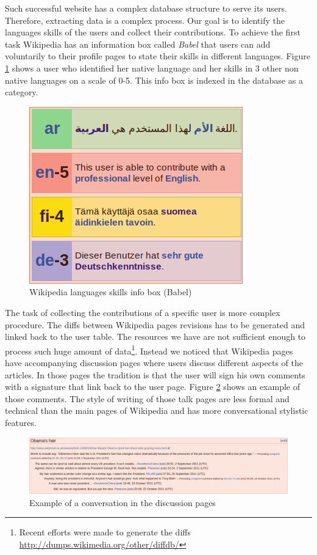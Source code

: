 \documentclass[10pt,a5paper,twoside]{article}
\begin{document}
Such successful website has a complex database structure to serve its users.
Therefore, extracting data is a complex process. Our goal is to identify the
languages skills of the users and collect their contributions. To achieve the
first task Wikipedia has an information box called \emph{Babel} that users can
add voluntarily to their profile pages to state their skills in different
languages. Figure \ref{babel} shows a user who identified her native language
and her skills in 3 other non native languages on a scale of 0-5. This info box
is indexed in the database as a category.

\begin{figure}
\centering
\includegraphics[scale=0.40]{babel} 
\caption{Wikipedia languages skills info box (Babel)}
\label{babel}
\end{figure}

The task of collecting the contributions of a specific user is more complex
procedure. The diffs between Wikipedia pages revisions has to be generated and
linked back to the user table. The resources we have are not sufficient enough to process such
huge amount of data\footnote{Recent efforts were
made to generate the diffs \url{http://dumps.wikimedia.org/other/diffdb/}}.
Instead we noticed that Wikipedia pages have accompanying discussion pages where
users discuss different aspects of the articles. In those pages the tradition is
that the user will sign his own comments with a signature that link back to the
user page. Figure \ref{obama} shows an example of those comments. The style of writing of those
talk pages are less formal and technical than the main pages of Wikipedia and has more conversational stylistic features.

\begin{figure}
\centering
\includegraphics[scale=0.225]{obama.png}
\caption{Example of a conversation in the discussion pages}
\label{obama}
\end{figure}
\end{document}
